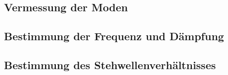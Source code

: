 \subsection{Vermessung der Moden}

\FloatBarrier

\FloatBarrier

\subsection{Bestimmung der Frequenz und Dämpfung}



\subsection{Bestimmung des Stehwellenverhältnisses}